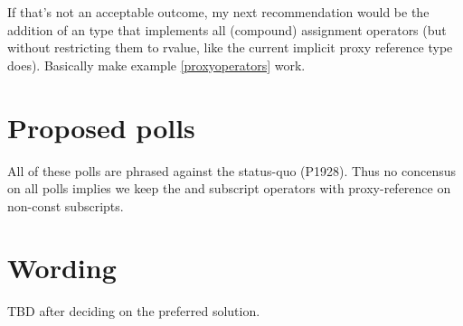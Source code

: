 If that's not an acceptable outcome, my next recommendation would be the
addition of an  type that implements all (compound)
assignment operators (but without restricting them to rvalue, like the current
implicit proxy reference type does).
Basically make example \ref{proxyoperators} work.


\section{Proposed polls}

All of these polls are phrased against the status-quo (P1928).
Thus no concensus on all polls implies we keep the \simd and \mask subscript
operators with proxy-reference on non-const subscripts.







\section{Wording}\label{sec:wording}

TBD after deciding on the preferred solution.


